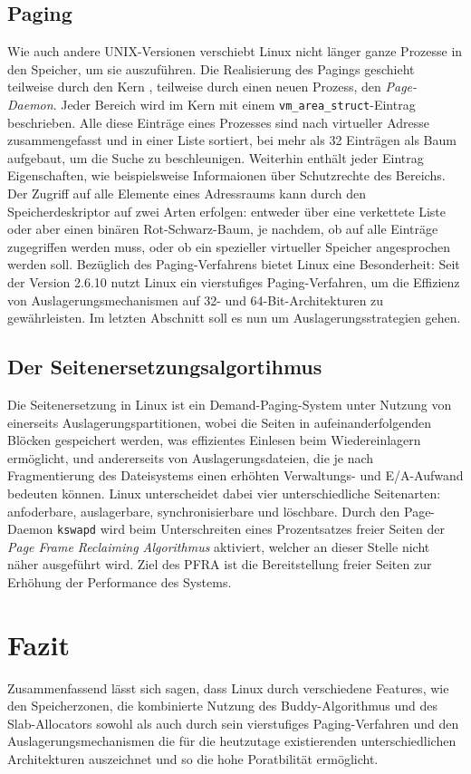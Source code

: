 \documentclass[11pt,a4paper]{article}
\begin{document}
\subsection*{Paging}
Wie auch andere UNIX-Versionen verschiebt Linux nicht länger ganze Prozesse in den Speicher, um sie auszuführen. Die Realisierung des Pagings geschieht teilweise durch den Kern , teilweise durch einen neuen Prozess, den \textit{Page-Daemon}. Jeder Bereich wird im Kern mit einem \texttt{vm\_area\_struct}-Eintrag beschrieben. Alle diese Einträge eines Prozesses sind nach virtueller Adresse zusammengefasst und in einer Liste sortiert, bei mehr als 32 Einträgen als Baum aufgebaut, um die Suche zu beschleunigen. Weiterhin enthält jeder Eintrag Eigenschaften, wie beispielsweise Informaionen über Schutzrechte des Bereichs. Der Zugriff auf alle Elemente eines Adressraums kann durch den Speicherdeskriptor auf zwei Arten erfolgen:  entweder über eine verkettete Liste oder aber einen binären Rot-Schwarz-Baum, je nachdem, ob auf alle Einträge zugegriffen werden muss, oder ob ein spezieller virtueller Speicher angesprochen werden soll. Bezüglich des Paging-Verfahrens bietet Linux eine Besonderheit:
Seit der Version 2.6.10 nutzt Linux ein vierstufiges Paging-Verfahren, um die Effizienz von Auslagerungsmechanismen auf 32- und 64-Bit-Architekturen zu gewährleisten. Im letzten Abschnitt soll es nun um Auslagerungsstrategien gehen.

\subsection*{Der Seitenersetzungsalgortihmus}
Die Seitenersetzung in Linux ist ein Demand-Paging-System unter Nutzung von einerseits  Auslagerungspartitionen, wobei die Seiten in aufeinanderfolgenden Blöcken gespeichert werden, was effizientes Einlesen beim Wiedereinlagern ermöglicht, und andererseits von Auslagerungsdateien, die je nach Fragmentierung des Dateisystems einen erhöhten Verwaltungs- und E/A-Aufwand bedeuten können.  Linux unterscheidet dabei vier unterschiedliche Seitenarten: anfoderbare, auslagerbare, synchronisierbare und löschbare. Durch den Page-Daemon \texttt{kswapd} wird beim Unterschreiten eines Prozentsatzes freier Seiten der \textit{Page Frame Reclaiming Algorithmus} aktiviert, welcher an dieser Stelle nicht näher ausgeführt wird. Ziel des PFRA ist die Bereitstellung freier Seiten zur Erhöhung der Performance des Systems.

\section*{Fazit}
Zusammenfassend lässt sich sagen, dass Linux durch verschiedene Features, wie den Speicherzonen, die kombinierte Nutzung des Buddy-Algorithmus und des Slab-Allocators sowohl als auch durch sein vierstufiges Paging-Verfahren und den Auslagerungsmechanismen die für die heutzutage existierenden unterschiedlichen Architekturen auszeichnet und so die hohe Poratbilität ermöglicht.
\end{document}
